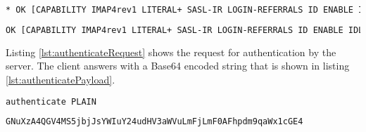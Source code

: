 \documentclass[parskip=full]{scrartcl}
\begin{document}
\begin{lstlisting}[language=tex, breaklines, frame=single, caption={Used Protocol IMAPv4rev1, SASL-IR for authentication}, label=lst:protocol, float, floatplacement=h]
* OK [CAPABILITY IMAP4rev1 LITERAL+ SASL-IR LOGIN-REFERRALS ID ENABLE IDLE AUTH=PLAIN AUTH=LOGIN] Dovecot ready.
\end{lstlisting}

\begin{lstlisting}[language=tex, breaklines, frame=single, caption={IMAP settings}, label=lst:protcol2, float, floatplacement=h]
OK [CAPABILITY IMAP4rev1 LITERAL+ SASL-IR LOGIN-REFERRALS ID ENABLE IDLE SORT SORT=DISPLAY THREAD=REFERENCES THREAD=REFS THREAD=ORDEREDSUBJECT MULTIAPPEND URL-PARTIAL CATENATE UNSELECT CHILDREN NAMESPACE UIDPLUS LIST-EXTENDED I18NLEVEL=1 CONDSTORE QRESYNC ESEARCH ESORT SEARCHRES WITHIN CONTEXT=SEARCH LIST-STATUS BINARY MOVE SPECIAL-USE] Logged in
\end{lstlisting}

Listing \ref{lst:authenticateRequest} shows the request for authentication by the server.
The client answers with a Base64 encoded string that is shown in listing \ref{lst:authenticatePayload}.


\begin{lstlisting}[language=tex, breaklines, frame=single, caption={Request for authentication by server}, label=lst:authenticateRequest, float, floatplacement=h]
authenticate PLAIN
\end{lstlisting}

\begin{lstlisting}[language=tex, breaklines, frame=single, caption={Base64 encoded message}, label=lst:authenticatePayload, float, floatplacement=h]
GNuXzA4QGV4MS5jbjJsYWIuY24udHV3aWVuLmFjLmF0AFhpdm9qaWx1cGE4
\end{lstlisting}
\end{document}
